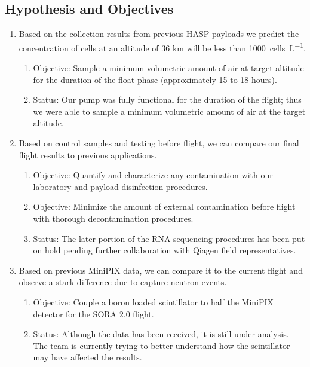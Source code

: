 \subsection{Hypothesis and Objectives}
\label{subsec:Hypothesis and Objectives}
\begin{enumerate}
	\item Based on the collection results from previous HASP payloads we predict the concentration of cells at an altitude of 36 km will be less than \SI{1000}{cells\per\liter}.
		\begin{enumerate}
			\item Objective: Sample a minimum volumetric amount of air at target altitude for the duration of the float phase (approximately 15 to 18 hours).
			\item Status: Our pump was fully functional for the duration of the flight; thus we were able to sample a minimum volumetric amount of air at the target altitude.		\end{enumerate}
%
	\item Based on control samples and testing before flight, we can compare our final flight results to previous applications.
		\begin{enumerate}
			\item Objective: Quantify and characterize any contamination with our laboratory and payload disinfection procedures.
			\item Objective: Minimize the amount of external contamination before flight with thorough decontamination procedures.
			\item Status: The later portion of the RNA sequencing procedures has been put on hold pending further collaboration with Qiagen field representatives.
		\end{enumerate}
%
	\item Based on previous MiniPIX data, we can compare it to the current flight and observe a stark difference due to capture neutron events.
		\begin{enumerate}
			\item Objective: Couple a boron loaded scintillator to half the MiniPIX detector for the SORA 2.0 flight.
			\item Status: Although the data has been received, it is still under analysis.  The team is currently trying to better understand how the scintillator may have affected the results. 
		\end{enumerate}	
\end{enumerate}

